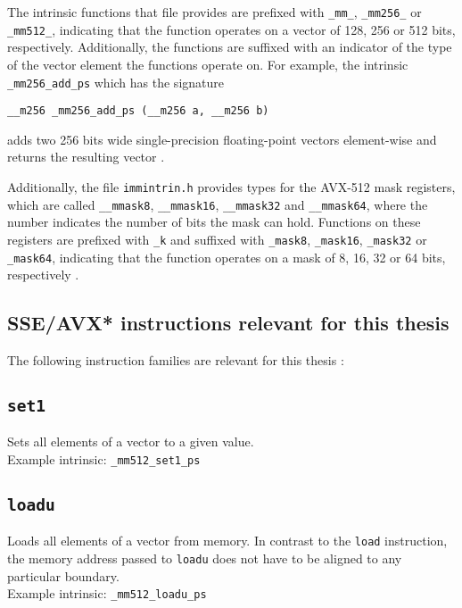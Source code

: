 \documentclass[12pt, a4paper, openright, twoside]{tiarbeit}
\begin{document}
The intrinsic functions that file provides are prefixed with \texttt{\_mm\_},
\texttt{\_mm256\_} or \texttt{\_mm512\_}, indicating that the function
operates on a vector of 128, 256 or 512 bits, respectively. Additionally,
the functions are suffixed with an indicator of the type of the vector
element the functions operate on. For example, the intrinsic
\texttt{\_mm256\_add\_ps} which has the signature
  {\par\centering\texttt{__m256 _mm256_add_ps (__m256 a, __m256 b)}\par}
\noindent adds two 256 bits wide single-precision floating-point
vectors element-wise and returns the resulting vector
\citep[pp. 3-12 - 3-14]{intel-manual}.

Additionally, the file \verb!immintrin.h! provides types for the AVX-512
mask registers, which are called \texttt{\_\_mmask8}, \texttt{\_\_mmask16},
\texttt{\_\_mmask32} and \texttt{\_\_mmask64}, where the number indicates the
number of bits the mask can hold.
Functions on these registers
are prefixed with \texttt{\_k} and suffixed with \texttt{\_mask8},
\texttt{\_mask16}, \texttt{\_mask32} or \texttt{\_mask64}, indicating
that the function operates on a mask of 8, 16, 32 or 64 bits, respectively
\citep{intel_intrinsics_guide}.

\subsection{SSE/AVX* instructions relevant for this thesis}

The following instruction families are relevant for this thesis
\citep{intel_intrinsics_guide}:

\subsection*{\texttt{set1}}
Sets all elements of a vector to a given value.\\
Example intrinsic: \texttt{\_mm512\_set1\_ps}

\subsection*{\texttt{loadu}}
Loads all elements of a vector from memory.
In contrast to the \texttt{load} instruction, the memory address passed to
\texttt{loadu} does not have to be aligned to any particular boundary.\\
Example intrinsic: \texttt{\_mm512\_loadu\_ps}
\end{document}

